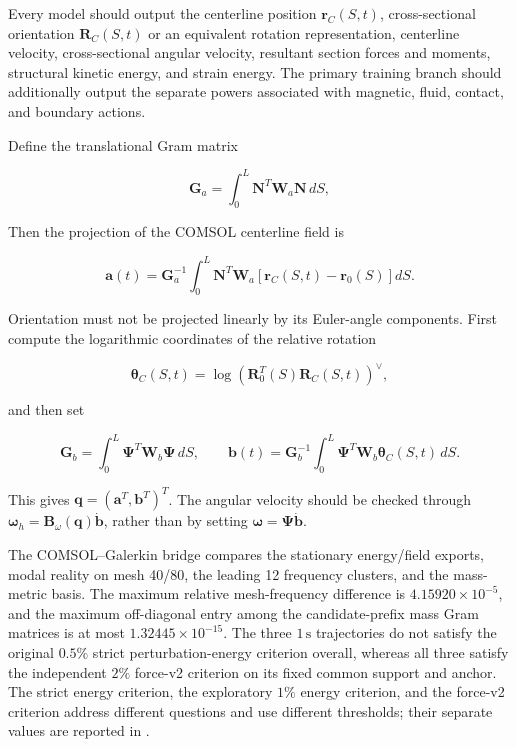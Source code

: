 Every model should output the centerline position \(\mathbf{r}_{C}(S,t)\), cross-sectional orientation \(\mathbf{R}_{C}(S,t)\) or an equivalent rotation representation, centerline velocity, cross-sectional angular velocity, resultant section forces and moments, structural kinetic energy, and strain energy. The primary training branch should additionally output the separate powers associated with magnetic, fluid, contact, and boundary actions.

Define the translational Gram matrix

\begin{equation}
\label{eq:galerkin-2-116}
\mathbf{G}_{a} = \int_{0}^{L}\mathbf{N}^{T}\mathbf{W}_{a}\mathbf{N}\, dS,
\end{equation}

Then the projection of the COMSOL centerline field is

\begin{equation}
\label{eq:galerkin-2-117}
\mathbf{a}(t) = \mathbf{G}_{a}^{- 1}\int_{0}^{L}\mathbf{N}^{T}\mathbf{W}_{a}\left\lbrack \mathbf{r}_{C}(S,t) - \mathbf{r}_{0}(S) \right\rbrack dS.
\end{equation}

Orientation must not be projected linearly by its Euler-angle components. First compute the logarithmic coordinates of the relative rotation

\begin{equation}
\label{eq:galerkin-2-118}
\bm{\theta}_{C}(S,t) = \log\left( \mathbf{R}_{0}^{T}(S)\mathbf{R}_{C}(S,t) \right)^{\vee},
\end{equation}

and then set

\begin{equation}
\label{eq:galerkin-2-119}
\mathbf{G}_{b} = \int_{0}^{L}\bm{\Psi}^{T}\mathbf{W}_{b}\bm{\Psi}\, dS,\quad\quad\mathbf{b}(t) = \mathbf{G}_{b}^{- 1}\int_{0}^{L}\bm{\Psi}^{T}\mathbf{W}_{b}\bm{\theta}_{C}(S,t)\, dS.
\end{equation}

This gives \(\mathbf{q} = \left( \mathbf{a}^{T},\mathbf{b}^{T} \right)^{T}\). The angular velocity should be checked through \(\bm{\omega}_{h} = \mathbf{B}_{\omega}\left( \mathbf{q} \right)\dot{\mathbf{b}}\), rather than by setting \(\bm{\omega} = \bm{\Psi}\dot{\mathbf{b}}\).

The COMSOL--Galerkin bridge compares the stationary energy/field exports, modal reality on mesh 40/80, the leading 12 frequency clusters, and the mass-metric basis. The maximum relative mesh-frequency difference is \(4.15920\times10^{-5}\), and the maximum off-diagonal entry among the candidate-prefix mass Gram matrices is at most \(1.32445\times10^{-15}\). The three \(1\,\mathrm{s}\) trajectories do not satisfy the original \(0.5\%\) strict perturbation-energy criterion overall, whereas all three satisfy the independent \(2\%\) force-v2 criterion on its fixed common support and anchor. The strict energy criterion, the exploratory \(1\%\) energy criterion, and the force-v2 criterion address different questions and use different thresholds; their separate values are reported in .

